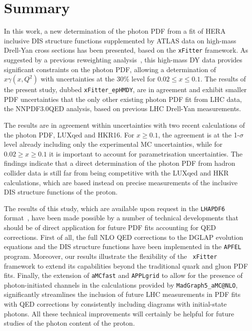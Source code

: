 \section{Summary}
\label{sec:conclusions}

In this work, a new determination of the photon PDF from
a fit of HERA inclusive DIS structure functions supplemented
by ATLAS data on high-mass Drell-Yan cross
sections has been presented, based on the {\tt xFitter} framework.
%
As suggested by a previous reweighting analysis~\cite{Aad:2016zzw}, this
high-mass DY data provides significant constraints on the photon PDF,
allowing a determination of $x\gamma(x, Q^2)$ with uncertainties at the
30\% level for $0.02 \le x \le 0.1$.
%
The results of the present study, dubbed {\tt xFitter\_epHMDY}, are in agreement
and exhibit smaller PDF uncertainties that the only
other existing photon PDF fit from LHC data, the 
NNPDF3.0QED analysis, based on previous LHC Drell-Yan measurements.

The results are in agreement within uncertainties with two recent
calculations of the photon PDF, LUXqed and HKR16.
%
For $x\ge 0.1$, the agreement is at the 1-$\sigma$ level already including
only the experimental MC uncertainties, while for $0.02 \ge x \ge 0.1$ it is
important to account for parametrisation uncertainties.
%
The findings indicate that a direct determination of the
photon PDF from hadron collider data
is still far from being competitive with the LUXqed and HKR
calculations, which are based instead on precise measurements of the inclusive DIS
structure functions of the proton.
%

The results of this study, which
 are available upon
 request in the {\tt LHAPDF6} format~\cite{Buckley:2014ana},
 have been made possible by a number of
technical developments that should be of direct application for future
PDF fits accounting for QED corrections.
%
First of all, the full NLO
QED corrections to the DGLAP evolution equations and the DIS
structure functions have been implemented in the  {\tt APFEL} program.
%
Moreover, our results illustrate the flexibility of the {\tt
  xFitter} framework to extend its capabilities beyond the traditional
quark and gluon PDF fits.
%
Finally, the extension of {\tt aMCfast} and {\tt APPLgrid} to allow
for the presence of photon-initiated channels in the calculations
provided by {\tt MadGraph5\_aMC@NLO}, significantly streamlines the
inclusion of future LHC measurements in PDF fits with QED corrections by
consistently including diagrams with initial-state photons.
%
All these technical improvements will certainly be helpful for future
studies of the photon content of the proton.\\

